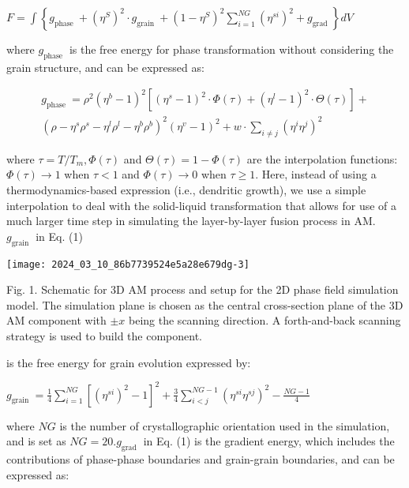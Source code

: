 \documentclass[10pt]{article}
\begin{document}
$F=\int\left\{g_{\text {phase }}+\left(\eta^{S}\right)^{2} \cdot g_{\text {grain }}+\left(1-\eta^{S}\right)^{2} \sum_{i=1}^{N G}\left(\eta^{s i}\right)^{2}+g_{\text {grad }}\right\} d V$

where $g_{\text {phase }}$ is the free energy for phase transformation without considering the grain structure, and can be expressed as:

\[
\begin{array}{r}
g_{\text {phase }}=\rho^{2}\left(\eta^{b}-1\right)^{2}\left[\left(\eta^{s}-1\right)^{2} \cdot \Phi(\tau)+\left(\eta^{l}-1\right)^{2} \cdot \Theta(\tau)\right]+ \\
\left(\rho-\eta^{s} \rho^{s}-\eta^{l} \rho^{l}-\eta^{b} \rho^{b}\right)^{2}\left(\eta^{v}-1\right)^{2}+w \cdot \sum_{i \neq j}\left(\eta^{i} \eta^{j}\right)^{2} \tag{2}
\end{array}
\]

where $\tau=T / T_{m}, \Phi(\tau)$ and $\Theta(\tau)=1-\Phi(\tau)$ are the interpolation functions: $\Phi(\tau) \rightarrow 1$ when $\tau<1$ and $\Phi(\tau) \rightarrow 0$ when $\tau \geq 1$. Here, instead of using a thermodynamics-based expression (i.e., dendritic growth), we use a simple interpolation to deal with the solid-liquid transformation that allows for use of a much larger time step in simulating the layer-by-layer fusion process in AM. $g_{\text {grain }}$ in Eq. (1)

\begin{center}
\texttt{[image: 2024\_03\_10\_86b7739524e5a28e679dg-3]}
\end{center}

Fig. 1. Schematic for 3D AM process and setup for the 2D phase field simulation model. The simulation plane is chosen as the central cross-section plane of the 3D AM component with $\pm x$ being the scanning direction. A forth-and-back scanning strategy is used to build the component.

is the free energy for grain evolution expressed by:

$g_{\text {grain }}=\frac{1}{4} \sum_{i=1}^{N G}\left[\left(\eta^{s i}\right)^{2}-1\right]^{2}+\frac{3}{4} \sum_{i<j}^{N G-1}\left(\eta^{s i} \eta^{s j}\right)^{2}-\frac{N G-1}{4}$

where $N G$ is the number of crystallographic orientation used in the simulation, and is set as $N G=20 . g_{\text {grad }}$ in Eq. (1) is the gradient energy, which includes the contributions of phase-phase boundaries and grain-grain boundaries, and can be expressed as:
\end{document}
